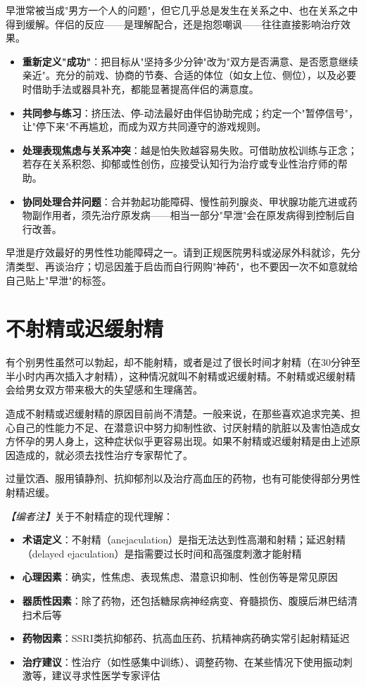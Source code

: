 早泄常被当成"男方一个人的问题"，但它几乎总是发生在关系之中、也在关系之中得到缓解。伴侣的反应——是理解配合，还是抱怨嘲讽——往往直接影响治疗效果。

\begin{itemize}
	\item \textbf{重新定义"成功"}：把目标从"坚持多少分钟"改为"双方是否满意、是否愿意继续亲近"。充分的前戏、协商的节奏、合适的体位（如女上位、侧位），以及必要时借助手法或器具补充，都能显著提高伴侣的满意度。
	\item \textbf{共同参与练习}：挤压法、停-动法最好由伴侣协助完成；约定一个"暂停信号"，让"停下来"不再尴尬，而成为双方共同遵守的游戏规则。
	\item \textbf{处理表现焦虑与关系冲突}：越是怕失败越容易失败。可借助放松训练与正念；若存在关系积怨、抑郁或性创伤，应接受认知行为治疗或专业性治疗师的帮助。
	\item \textbf{协同处理合并问题}：合并勃起功能障碍、慢性前列腺炎、甲状腺功能亢进或药物副作用者，须先治疗原发病——相当一部分"早泄"会在原发病得到控制后自行改善。
\end{itemize}

\begin{tcolorbox}[colback=pink!5!white,colframe=red!50!black,title=贴心小叮咛]
早泄是疗效最好的男性性功能障碍之一。请到正规医院男科或泌尿外科就诊，先分清类型、再谈治疗；切忌因羞于启齿而自行网购"神药"，也不要因一次不如意就给自己贴上"早泄"的标签。
\end{tcolorbox}

\section{不射精或迟缓射精}

有个别男性虽然可以勃起，却不能射精，或者是过了很长时间才射精（在30分钟至半小时内再次插入才射精），这种情况就叫不射精或迟缓射精。不射精或迟缓射精会给男女双方带来极大的失望感和生理痛苦。

造成不射精或迟缓射精的原因目前尚不清楚。一般来说，在那些喜欢追求完美、担心自己的性能力不足、在潜意识中努力抑制性欲、讨厌射精的肮脏以及害怕造成女方怀孕的男人身上，这种症状似乎更容易出现。如果不射精或迟缓射精是由上述原因造成的，就必须去找性治疗专家帮忙了。

过量饮酒、服用镇静剂、抗抑郁剂以及治疗高血压的药物，也有可能使得部分男性射精迟缓。

\noindent\textit{【编者注】}关于不射精症的现代理解：
\begin{itemize}
	\item \textbf{术语定义}：不射精（anejaculation）是指无法达到性高潮和射精；延迟射精（delayed ejaculation）是指需要过长时间和高强度刺激才能射精
	\item \textbf{心理因素}：确实，性焦虑、表现焦虑、潜意识抑制、性创伤等是常见原因
	\item \textbf{器质性因素}：除了药物，还包括糖尿病神经病变、脊髓损伤、腹膜后淋巴结清扫术后等
	\item \textbf{药物因素}：SSRI类抗抑郁药、抗高血压药、抗精神病药确实常引起射精延迟
	\item \textbf{治疗建议}：性治疗（如性感集中训练）、调整药物、在某些情况下使用振动刺激等，建议寻求性医学专家评估
\end{itemize}

